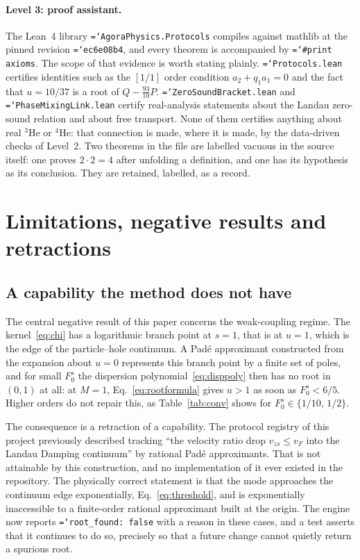 \documentclass[11pt,a4paper]{article}
\newcommand{\Fzs}{F_0^{s}}
\newcommand{\code}[1]{\texttt{\hyphenchar\font=`\-\relax #1}}
\begin{document}
\paragraph{Level 3: proof assistant.} The Lean~4 library
\code{AgoraPhysics.Protocols} compiles against mathlib at the pinned revision
\code{ec6e08b4}, and every theorem is accompanied by \code{\#print axioms}. The
scope of that evidence is worth stating plainly.
\code{Protocols.lean} certifies identities such as the $[1/1]$ order condition
$a_2 + q_1 a_1 = 0$ and the fact that $u=10/37$ is a root of $Q - \tfrac{93}{10}P$.
\code{ZeroSoundBracket.lean} and \code{PhaseMixingLink.lean} certify real-analysis statements
about the Landau zero-sound relation and about free transport. None of them certifies anything
about real $^3$He or $^4$He: that connection is made, where it is made, by the data-driven checks
of Level~2. Two theorems in the file are labelled vacuous in the source itself: one
proves $2\cdot 2 = 4$ after unfolding a definition, and one has its hypothesis
as its conclusion. They are retained, labelled, as a record.

\section{Limitations, negative results and retractions}
\label{sec:limits}

\subsection{A capability the method does not have}

The central negative result of this paper concerns the weak-coupling regime.
The kernel~\eqref{eq:chi} has a logarithmic branch point at $s=1$, that is at
$u=1$, which is the edge of the particle--hole continuum. A Pad\'e approximant
constructed from the expansion about $u=0$ represents this branch point by a
finite set of poles, and for small $\Fzs$ the dispersion
polynomial~\eqref{eq:disppoly} then has no root in $(0,1)$ at all: at $M=1$,
Eq.~\eqref{eq:rootformula} gives $u>1$ as soon as $\Fzs < 6/5$. Higher orders do
not repair this, as Table~\ref{tab:conv} shows for $\Fzs \in \{1/10,\,1/2\}$.

The consequence is a retraction of a capability. The protocol registry of this
project previously described tracking ``the velocity ratio drop
$v_{zs}\le v_F$ into the Landau Damping continuum'' by rational Pad\'e
approximants. That is not attainable by this construction, and no
implementation of it ever existed in the repository. The physically correct
statement is that the mode approaches the continuum edge exponentially,
Eq.~\eqref{eq:threshold}, and is exponentially inaccessible to a
finite-order rational approximant built at the origin. The engine now reports
\code{root\_found: false} with a reason in these cases, and a test asserts that
it continues to do so, precisely so that a future change cannot quietly return
a spurious root.
\end{document}
